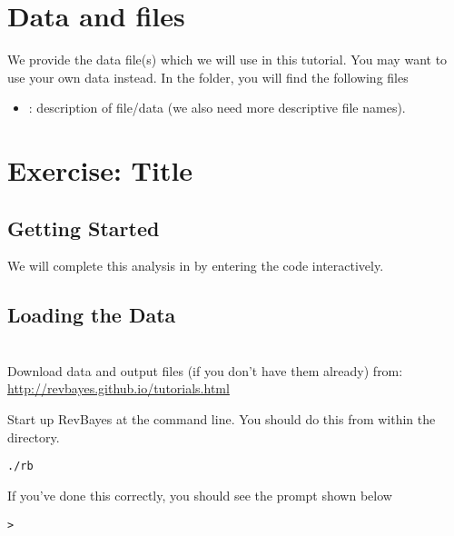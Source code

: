 \section{Data and files}

We provide the data file(s) which we will use in this tutorial.
You may want to use your own data instead.
In the  folder, you will find the following files
\begin{itemize}
\item {}: description of file/data (we also need more descriptive file names).
\end{itemize}



\section{Exercise: Title}

\bigskip
\subsection{Getting Started}

We will complete this analysis in \RevBayes by entering the \Rev code interactively. 


\bigskip

\subsection{Loading the Data}

\noindent \\ \impmark Download data and output files (if you don't have them already) from: \\ \href{http://revbayes.github.io/tutorials.html}{http://revbayes.github.io/tutorials.html} \par

Start up RevBayes at the command line. You should do this from within the  directory.
{\tt \begin{snugshade*}
\begin{lstlisting}
./rb
\end{lstlisting}
\end{snugshade*}}

If you've done this correctly, you should see the prompt shown below
{\tt \begin{snugshade*}
\begin{lstlisting}
>
\end{lstlisting}
\end{snugshade*}}


